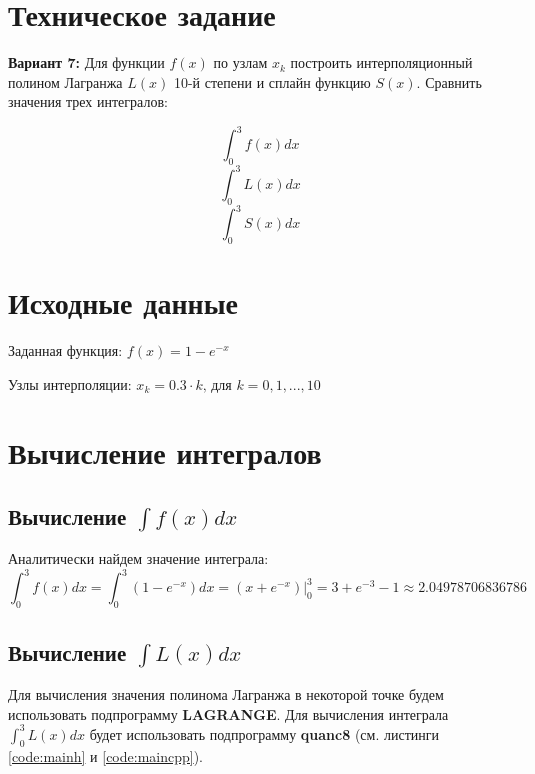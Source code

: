 





\section{Техническое задание}

\textbf{Вариант 7:} Для функции $f(x)$ по узлам $x_k$ построить интерполяционный полином Лагранжа $L(x)$ 10-й степени и сплайн функцию $S(x)$. Сравнить значения трех интегралов:

\begin{multicols}{3}
	\noindent 
	\[\int_0^3 f(x)dx\]
	\[\int_0^3 L(x)dx\]
	\[\int_0^3 S(x)dx\]
\end{multicols}

\section{Исходные данные}

Заданная функция: $f(x) = 1 - e^{-x}$

\vspace{0.3cm}

Узлы интерполяции: $x_k = 0.3 \cdot k\text{, для }k = 0, 1, ..., 10$

\section{Вычисление интегралов}

\subsection{Вычисление $\int f(x)dx$}

Аналитически найдем значение интеграла:
\vspace{-0.2cm}
\[
\int_0^3 f(x)dx = \int_0^3 \left(1 - e^{-x}\right) dx = \left.\left( x + e^{-x} \right)\right\vert_0^3 = 3 + e^{-3} - 1 \approx 2.04978706836786
\]

\subsection{Вычисление $\int L(x)dx$}

Для вычисления значения полинома Лагранжа в некоторой точке будем использовать подпрограмму \textbf{LAGRANGE}. Для вычисления интеграла $\int_0^3 L(x)dx$ будет использовать подпрограмму \textbf{quanc8} (см. листинги \ref{code:mainh} и \ref{code:maincpp}).

